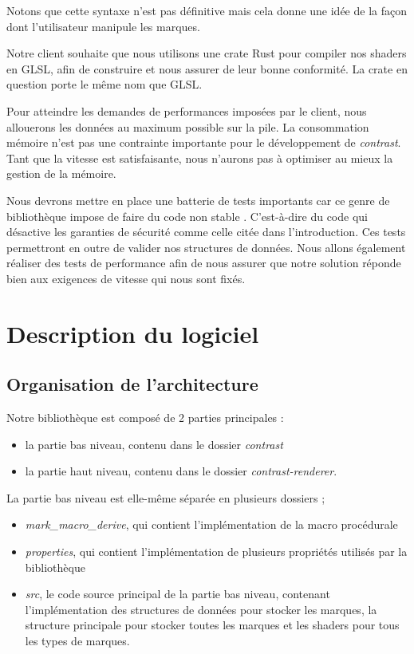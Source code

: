 \documentclass[12pt]{article}
\begin{document}

Notons que cette syntaxe n'est pas définitive mais cela donne une idée de la façon
dont l'utilisateur manipule les marques.

Notre client souhaite que nous utilisons une crate Rust pour compiler
nos shaders en GLSL, afin de construire et nous assurer de leur bonne conformité.
La crate en question porte le même nom que GLSL\cite{GLSL}.

Pour atteindre les demandes de performances imposées par le client, nous allouerons les données au maximum possible sur la pile.
La consommation mémoire n'est pas une contrainte importante pour le développement de \textit{contrast}. Tant
que la vitesse est satisfaisante, nous n'aurons pas à optimiser au mieux la gestion de la mémoire.

Nous devrons mettre en place une batterie de tests importants car ce genre de bibliothèque impose de faire
du code \og non stable \fg{}.
C'est-à-dire du code qui désactive les garanties de sécurité comme celle citée dans l'introduction.
Ces tests permettront en outre de valider nos structures de données.
Nous allons également réaliser des tests de performance afin de nous assurer que notre solution réponde bien
aux exigences de vitesse qui nous sont fixés.

\section{Description du logiciel}
\subsection{Organisation de l'architecture}

Notre bibliothèque est composé de 2 parties principales :
\begin{itemize}
\item la partie bas niveau, contenu dans le dossier \textit{contrast}
\item la partie haut niveau, contenu dans le dossier  \textit{contrast-renderer}.
\end{itemize}

La partie bas niveau est elle-même séparée en plusieurs dossiers ;
\begin{itemize}
\item \textit{mark\_macro\_derive}, qui contient l'implémentation de la macro procédurale
\item \textit{properties}, qui contient l'implémentation de plusieurs propriétés utilisés par la bibliothèque
\item \textit{src}, le code source principal de la partie bas niveau, contenant l'implémentation des structures de données pour stocker les marques, la structure principale pour stocker toutes les marques et les shaders pour tous les types de marques.
\end{itemize}
\end{document}
